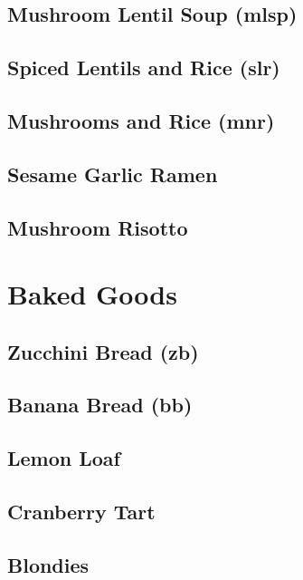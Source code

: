 \documentclass{report}
\begin{document}
\section{Mushroom Lentil Soup (mlsp)}

\newpage
\section{Spiced Lentils and Rice (slr)}

\newpage
\section{Mushrooms and Rice (mnr)}

\newpage
\section{Sesame Garlic Ramen}

\newpage
\section{Mushroom Risotto}




\chapter{Baked Goods}
\newpage
\section{Zucchini Bread (zb)}


\newpage
\section{Banana Bread (bb)}


\newpage
\section{Lemon Loaf}


\newpage 
\section{Cranberry Tart}


\newpage
\section{Blondies}

\end{document}
